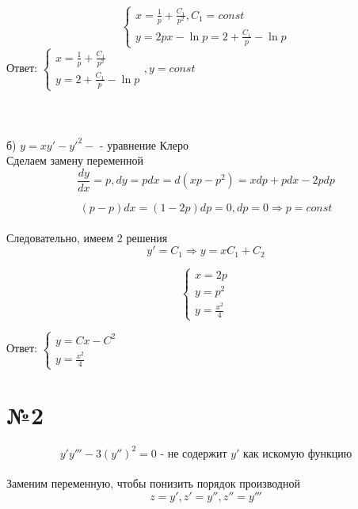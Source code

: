 \documentclass{article}
\begin{document}
\begin{equation*}
    \begin{cases}
    x = \frac{1}{p} +\frac{C_1}{p^2}, C_1 = const\\
    y = 2px - \ln{p} = 2 + \frac{C_1}{p} - \ln{p}
    \end{cases}
\end{equation*}
Ответ:
$
    \begin{cases}
     x = \frac{1}{p} +\frac{C_1}{p^2}\\
    y = 2 + \frac{C_1}{p} - \ln{p}
    \end{cases}, y = const
$\\\\
\\\\
б) $ y = xy' - {y'}^2 -\text{ - уравнение Клеро} $
\\Сделаем замену переменной\\
\begin{equation*}
    \frac{dy}{dx} = p , dy = pdx = d (xp - p^2) = xdp + pdx - 2pdp
\end{equation*}

\begin{equation*}
    (p - p)dx = (1 - 2p)dp = 0, dp = 0 \Rightarrow p = const
\end{equation*}
\\Следовательно, имеем 2 решения\\
\begin{equation*}
    y' = C_1 \Rightarrow y = xC_1 + C_2
\end{equation*}

\begin{equation*}
    \begin{cases}
    x = 2p\\
    y = p^2\\
    y = \frac{x^2}{4}
    \end{cases}
\end{equation*}

Ответ: $\begin{cases}
y = Cx - C^2 \\
y = \frac{x^2}{4}
\end{cases}$

\section*{№2}
\begin{equation*}
    y'y''' - 3 (y'')^2 = 0 \text{ - не содержит $y'$ как искомую функцию}
\end{equation*}
\\Заменим переменную, чтобы понизить порядок производной\\
\begin{equation*}
    z = y', z' = y'', z'' = y'''
\end{equation*}
\end{document}
